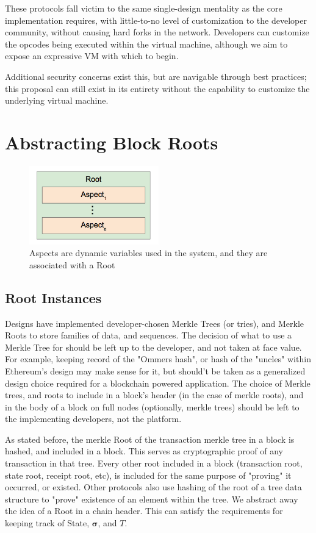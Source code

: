 \documentclass[12pt, titlepage, twocolumn]{report}
\begin{document}
These protocols fall victim to the same single-design mentality as the core implementation requires, with little-to-no level of customization to the developer community, without causing hard forks in the network. Developers can customize the opcodes being executed within the virtual machine, although we aim to expose an expressive VM with which to begin. 

Additional security concerns exist this, but are navigable through best practices; this proposal can still exist in its entirety without the capability to customize the underlying virtual machine.


\chapter{Abstracting Block Roots}

\begin{figure}[ht]
\centering
	\includegraphics[width=0.5\textwidth]{aspect_in_root}
	\caption{Aspects are dynamic variables used in the system, and they are associated with a Root}
	\label{aspect_in_root}
\end{figure}

\section{Root Instances} 
Designs have implemented developer-chosen Merkle Trees (or tries), and Merkle Roots to store families of data, and sequences. The decision of what to use a Merkle Tree for should be left up to the developer, and not taken at face value. For example, keeping record of the "Ommers hash", or hash of the "uncles" within Ethereum's design may make sense for it, but should't be taken as a generalized design choice required for a blockchain powered application. The choice of Merkle trees, and roots to include in a block's header (in the case of merkle roots), and in the body of a block on full nodes (optionally, merkle trees) should be left to the implementing developers, not the platform. 

As stated before, the merkle Root of the transaction merkle tree in a block is hashed, and included in a block. This serves as cryptographic proof of any transaction in that tree. Every other root included in a block (transaction root, state root, receipt root, etc), is included for the same purpose of "proving" it occurred, or existed. Other protocols also use hashing of the root of a tree data structure to "prove" existence of an element within the tree. We abstract away the idea of a Root in a chain header. This can satisfy the requirements for keeping track of State, \(\boldsymbol{\sigma}\), and \(T\). 
\end{document}
